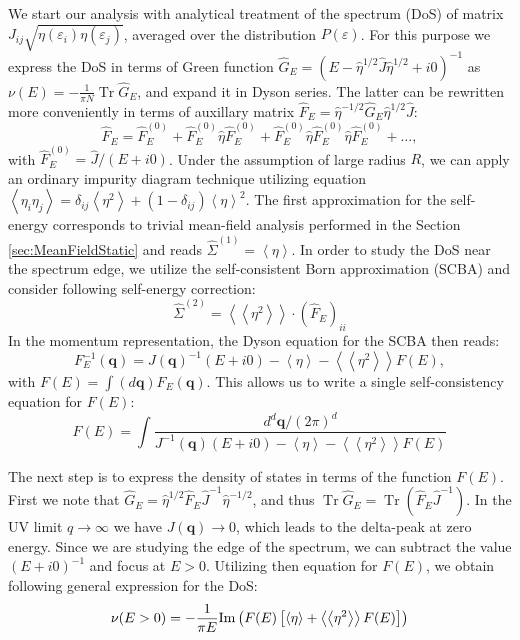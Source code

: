 \documentclass[twocolumn,english,prb]{revtex4-1}
\newcommand{\Tr}{\operatorname{Tr}}
\begin{document}
We start our analysis with analytical treatment of the spectrum (DoS) of matrix $J_{ij} \sqrt{\eta(\varepsilon_i) \eta(\varepsilon_{j})}$, averaged over the distribution $P(\varepsilon)$. For this purpose we express the DoS in terms of Green function $\hat{G}_E=(E-\hat{\eta}^{1/2}\hat{J}\hat{\eta}^{1/2}+i0)^{-1}$ as $\nu(E) = -\frac{1}{\pi N}\Tr\hat{G}_E$, and expand it in Dyson series. The latter can be rewritten more conveniently in terms of auxillary matrix $\hat{F}_{E}=\hat{\eta}^{-1/2}\hat{G}_{E}\hat{\eta}^{1/2}\hat{J}$:
\begin{equation}
\hat{F}_{E}=\hat{F}_{E}^{(0)}+\hat{F}_{E}^{(0)}\hat{\eta}\hat{F}_{E}^{(0)}+\hat{F}_{E}^{(0)}\hat{\eta}\hat{F}_{E}^{(0)}\hat{\eta}\hat{F}_{E}^{(0)}+\dots,
\end{equation}
with $\hat{F}_{E}^{(0)}=\hat{J}/(E+i0)$. Under the assumption of large radius $R$, we can apply an ordinary impurity diagram technique utilizing equation $\left\langle \eta_{i}\eta_{j}\right\rangle =\delta_{ij}\left\langle \eta^{2}\right\rangle +(1-\delta_{ij})\left\langle \eta\right\rangle ^{2}$. The first approximation for the self-energy corresponds to trivial mean-field analysis performed in the Section \ref{sec:MeanFieldStatic} and reads $\hat{\Sigma}^{(1)} = \left\langle\eta\right\rangle$. In order to study the DoS near the spectrum edge, we utilize the self-consistent Born approximation (SCBA) and consider following self-energy correction:
\begin{equation}
\hat{\Sigma}^{(2)}=\left\langle \left\langle \eta^{2}\right\rangle \right\rangle \cdot(\hat{F}_{E})_{ii}
\end{equation}
In the momentum representation, the Dyson equation for the SCBA then reads:
\begin{equation}
\label{eq:SCBA}
F_{E}^{-1}(\boldsymbol{q})=J(\boldsymbol{q})^{-1}(E+i0)-\left\langle \eta\right\rangle -\left\langle \left\langle \eta^{2}\right\rangle \right\rangle F(E),
\end{equation}
with $F(E)=\int(d\boldsymbol{q})F_{E}(\boldsymbol{q})$. This allows us to write a single self-consistency equation for $F(E)$: 
\begin{equation}
\label{eq:SCBAF}
F(E)=\int\frac{d^d\boldsymbol{q} / (2\pi)^d}{J^{-1}(\boldsymbol{q})(E+i0)-\left\langle \eta\right\rangle -\left\langle \left\langle \eta^{2}\right\rangle \right\rangle F(E)}
\end{equation}

The next step is to express the density of states in terms of the function $F(E)$. First we note that $\hat{G}_{E}=\hat{\eta}^{1/2}\hat{F}_{E}\hat{J}^{-1}\hat{\eta}^{-1/2}$, and thus $\Tr\hat{G}_{E}=\Tr(\hat{F}_{E}\hat{J}^{-1})$.
In the UV limit $q \to \infty$ we have $J(\boldsymbol{q}) \to 0$, which leads to the delta-peak at zero energy. Since we are studying the edge of the spectrum, we can subtract the value $(E + i0)^{-1}$ and focus at $E > 0$. Utilizing then equation for $F(E)$, we obtain following general expression for the DoS:
\begin{equation}
\nu(E>0)=-\frac{1}{\pi E}{\rm Im}\left(F(E)\left[\left\langle \eta\right\rangle +\left\langle \left\langle \eta^{2}\right\rangle \right\rangle F(E)\right]\right)
\end{equation}
\end{document}
